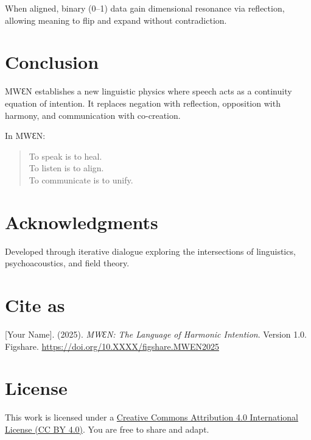 \documentclass[11pt,a4paper]{article}
\begin{document}
When aligned, binary (0–1) data gain dimensional resonance via reflection, allowing meaning to flip and expand without contradiction.

\section{Conclusion}

MWƐN establishes a new linguistic physics where speech acts as a continuity equation of intention.
It replaces negation with reflection, opposition with harmony, and communication with co-creation.

In MWƐN:
\begin{quote}
To speak is to heal. \\
To listen is to align. \\
To communicate is to unify.
\end{quote}

\section*{Acknowledgments}
Developed through iterative dialogue exploring the intersections of linguistics, psychoacoustics, and field theory.

\section*{Cite as}
[Your Name]. (2025). \emph{MWƐN: The Language of Harmonic Intention}. Version 1.0.\\
Figshare. \url{https://doi.org/10.XXXX/figshare.MWEN2025}

\section*{License}
This work is licensed under a \href{http://creativecommons.org/licenses/by/4.0/}{Creative Commons Attribution 4.0 International License (CC BY 4.0)}. You are free to share and adapt.
\end{document}
